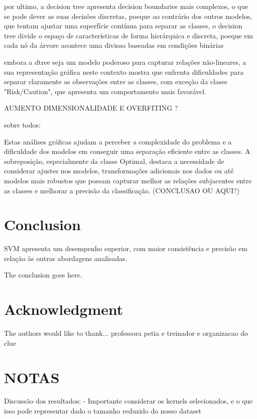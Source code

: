 \documentclass[conference]{IEEEtran}
\begin{document}
por ultimo, a decision tree apresenta decision boundaries mais complexos, o que se pode dever as suas decisões discretas, poeque ao contrário dos outros modelos, que tentam ajustar uma superfície contínua para separar as classes, o decision tree divide o espaço de características de forma hierárquica e discreta, poeque em cada nó da árvore acontece uma divisao baseadas em condições binárias

embora a dtree seja um modelo poderoso para capturar relações não-lineares, a sua representação gráfica neste contexto mostra que enfrenta dificuldades para separar claramente as observações entre as classes, com exceção da classe "Risk/Caution", que apresenta um comportamento mais favorável.

AUMENTO DIMENSIONALIDADE E OVERFITING ?

sobre todos: 

Estas análises gráficas ajudam a perceber a complexidade do problema e a dificuldade dos modelos em conseguir uma separação eficiente entre as classes. A sobreposição, especialmente da classe Optimal, destaca a necessidade de considerar ajustes nos modelos, transformações adicionais nos dados ou até modelos mais robustos que possam capturar melhor as relações subjacentes entre as classes e melhorar a precisão da classificação. (CONCLUSAO OU AQUI?)

\section{Conclusion}

SVM apresenta um desempenho superior, com maior consistência e precisão em relação às outras abordagens analisadas.

The conclusion goes here.

\section*{Acknowledgment}


The authors would like to thank... professora petia e treinador e organizacao do clue


\section{NOTAS}

Discussão dos resultados:
-\> Importante considerar os kernels selecionados, e o que isso pode representar dado o tamanho reduzido do nosso dataset
\end{document}
